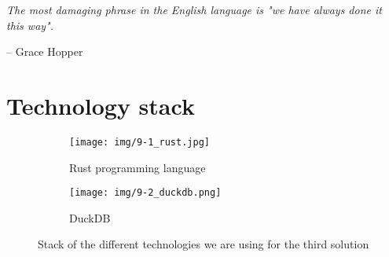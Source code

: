 \epigraph{\textit{The most damaging phrase in the English language is "we have always done it this way".}}{-- \textup{Grace Hopper}}

\section{Technology stack}

\begin{figure}[ht]
    \begin{subfigure}{.45\textwidth}
        \centering
        \texttt{[image: img/9-1\_rust.jpg]}
        \caption{Rust programming language}
    \end{subfigure}%
    \hspace*{0.5em}
    \begin{subfigure}{.45\textwidth}
        \centering
        \texttt{[image: img/9-2\_duckdb.png]}
        \caption{DuckDB}
    \end{subfigure}%
    \caption{Stack of the different technologies we are using for the third solution}
\end{figure}